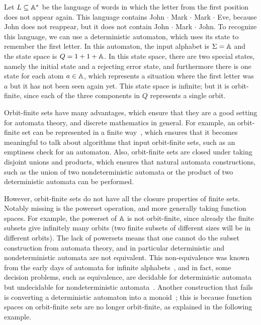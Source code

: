 \documentclass[a4paper,UKenglish,cleveref, autoref, thm-restate]{lipics-v2021}
\begin{document}
\begin{example}\label{ex:first-letter-repeats}
    Let  $L \subseteq \mathbb A^*$ be the language of  words in which the letter from the first position does not appear again. This language contains John $\cdot$ Mark $\cdot$ Mark $\cdot$ Eve, because John does not reappear, but it does not contain John $\cdot$ Mark $\cdot$ John. To recognize this language, we can use a deterministic automaton, which uses its state to remember the first letter. In this automaton, the input alphabet is $\Sigma = \mathbb A$ and  the state space is $Q = 1 + 1 + \mathbb A$. In this state space, there are two special states, namely the initial state and a rejecting error state, and furthermore there is one state for each atom $a \in \mathbb A$, which represents a situation where the first letter was $a$ but it has not been seen again yet. This state space is infinite; but it is orbit-finite, since each of the three components in $Q$ represents a single orbit.\exampleend
\end{example}

Orbit-finite sets have many advantages, which ensure that they are a good setting for automata theory, and discrete mathematics in general. For example, an orbit-finite set can be represented in a finite way~\cite{bojanczyk_slightly2018}, which ensures that it becomes meaningful to talk about algorithms that input orbit-finite sets, such as an emptiness check for an automaton. Also, orbit-finite sets are closed under taking disjoint unions and products, which ensures that natural automata constructions, such as the union of two nondeterministic automata or the product of two deterministic automata can be performed.

However, orbit-finite sets do not have all the closure properties of finite sets. Notably missing is the powerset operation, and more generally taking function spaces. For example, the powerset of $\mathbb A$ is not orbit-finite, since already the finite subsets give infinitely many orbits (two finite subsets of different sizes will be in different orbits). The lack of powersets means that one cannot do the subset construction from automata theory, and in particular deterministic and nondeterministic automata are not equivalent. This non-equivalence was known from the early days of automata for infinite alphabets~\cite{kaminskiFiniteMemoryAutomata1994}, and in fact, some decision problems, such as equivalence, are decidable for deterministic automata but undecidable for nondeterministic automata~\cite{nevenFiniteStateMachines2004}. Another construction that fails is converting a deterministic automaton into a monoid~\cite[p.~221]{bojanczykNominalMonoids2013}; this is because function spaces on orbit-finite sets are no longer orbit-finite, as explained in the following example.
\end{document}
